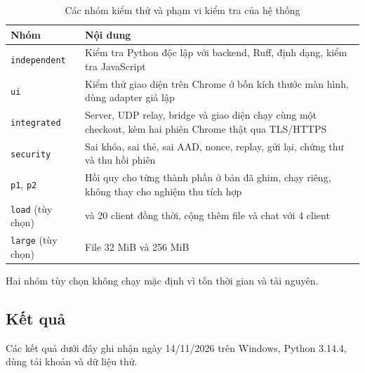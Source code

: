 \begin{table}[H]
    \centering
    \small
    \renewcommand{\arraystretch}{1.4}

    \begin{tabularx}{\textwidth}{
        @{}
        >{\raggedright\arraybackslash}p{2.5cm}
        >{\raggedright\arraybackslash}X
        @{}
    }
        \toprule
        \textbf{Nhóm} & \textbf{Nội dung} \\
        \midrule

        \texttt{independent}
        & Kiểm tra Python độc lập với backend, Ruff, định dạng, kiểm tra JavaScript \\

        \texttt{ui}
        & Kiểm thử giao diện trên Chrome ở bốn kích thước màn hình, dùng adapter giả lập \\

        \texttt{integrated}
        & Server, UDP relay, bridge và giao diện chạy cùng một checkout, kèm hai phiên Chrome thật qua TLS/HTTPS \\

        \texttt{security}
        & Sai khóa, sai thẻ, sai AAD, nonce, replay, gửi lại, chứng thư và thu hồi phiên \\

        \texttt{p1}, \texttt{p2}
        & Hồi quy cho từng thành phần ở bản đã ghim, chạy riêng, không thay cho nghiệm thu tích hợp \\

        \texttt{load} (tùy chọn)
        & 10 và 20 client đồng thời, cộng thêm file và chat với 4 client \\

        \texttt{large} (tùy chọn)
        & File 32 MiB và 256 MiB \\

        \bottomrule
    \end{tabularx}
    \caption{Các nhóm kiểm thử và phạm vi kiểm tra của hệ thống}
\end{table}


Hai nhóm tùy chọn không chạy mặc định vì tốn thời gian và tài nguyên.

\subsection{Kết quả}
Các kết quả dưới đây ghi nhận ngày 14/11/2026 trên Windows, Python 3.14.4, dùng tải khoản và dữ liệu thử.

